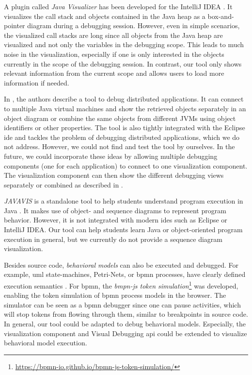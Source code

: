 \documentclass[conference]{IEEEtran}
\newcommand{\intellij}{IntelliJ IDEA}
\begin{document}
A plugin called \textit{Java Visualizer} has been developed for the \intellij{} \cite{JavaVisualizerIntelliJ}.
It visualizes the call stack and objects contained in the Java heap as a box-and-pointer diagram during a debugging session.
However, even in simple scenarios, the visualized call stacks are long since all objects from the Java heap are visualized and not only the variables in the debugging scope.
This leads to much noise in the visualization, especially if one is only interested in the objects currently in the scope of the debugging session.
In contrast, our tool only shows relevant information from the current scope and allows users to load more information if needed.

In \cite{kochGraphicalDebuggingDistributed2015}, the authors describe a tool to debug distributed applications.
It can connect to multiple Java virtual machines and show the retrieved objects separately in an object diagram or combine the same objects from different JVMs using object identifiers or other properties.
The tool is also tightly integrated with the Eclipse \gls*{ide} and tackles the problem of debugging distributed applications, which we do not address.
However, we could not find and test the tool by ourselves.
In the future, we could incorporate these ideas by allowing multiple debugging components (one for each application) to connect to one visualization component.
The visualization component can then show the different debugging views separately or combined as described in \cite{kochGraphicalDebuggingDistributed2015}.

\textit{JAVAVIS} is a standalone tool to help students understand program execution in Java \cite{oechsleJAVAVISAutomaticProgram2002}.
It makes use of object- and sequence diagrams to represent program behavior.
However, it is not integrated with modern \glspl*{ide} such as Eclipse or \intellij{}.
Our tool can help students learn Java or object-oriented program execution in general, but we currently do not provide a sequence diagram visualization.

Besides source code, \textit{behavioral models} can also be executed and debugged.
For example, \gls*{uml} state-machines, Petri-Nets, or \gls*{bpmn} processes, have clearly defined execution semantics \cite{objectmanagementgroupUnifiedModelingLanguage2017, objectmanagementgroupBusinessProcessModel2013}.
For \gls*{bpmn}, the \textit{bmpn-js token simulation}\footnote{\url{https://bpmn-io.github.io/bpmn-js-token-simulation/}} was developed, enabling the token simulation of \gls*{bpmn} process models in the browser.
The simulator can be seen as a \gls*{bpmn} debugger since one can pause activities, which will stop tokens from flowing through them, similar to breakpoints in source code.
In general, our tool could be adapted to debug behavioral models.
Especially, the visualization component and Visual Debugging \gls*{api} could be extended to visualize behavioral model execution.
\end{document}
